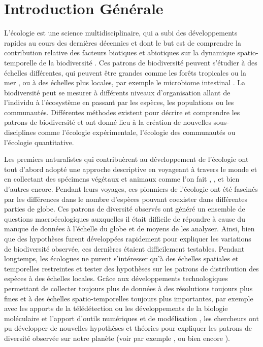 \begin{refsection}

\hypertarget{introduction-guxe9nuxe9rale}{%
\chapter{Introduction Générale}\label{introduction-guxe9nuxe9rale}}

L'écologie est une science multidisciplinaire, qui a subi des
développements rapides au cours des dernières décennies et dont le but
est de comprendre la contribution relative des facteurs biotiques et
abiotiques sur la dynamique spatio-temporelle de la biodiversité
\autocite{Campbell_2012}. Ces patrons de biodiversité peuvent s'étudier
à des échelles différentes, qui peuvent être grandes comme les forêts
tropicales ou la mer \autocite{Chapin_2011}, ou à des échelles plus
locales, par exemple le microbiome intestinal \autocite{Foster_2017}. La
biodiversité peut se mesurer à différents niveaux d'organisation allant
de l'individu à l'écosystème en passant par les espèces, les populations
ou les communautés. Différentes méthodes existent pour décrire et
comprendre les patrons de biodiversité et ont donné lieu à la création
de nouvelles sous-disciplines comme l'écologie expérimentale, l'écologie
des communautés ou l'écologie quantitative.

Les premiers naturalistes qui contribuèrent au développement de
l'écologie ont tout d'abord adopté une approche descriptive en voyageant
à travers le monde et en collectant des spécimens végétaux et animaux
comme l'on fait \textcite{Linnaeus_1789}, \textcite{Humboldt_1805},
\textcite{Darwin_1839} et bien d'autres encore. Pendant leurs voyages,
ces pionniers de l'écologie ont été fascinés par les différences dans le
nombre d'espèces pouvant coexister dans différentes parties de globe.
Ces patrons de diversité observés ont généré un ensemble de questions
macroécologiques auxquelles il était difficile de répondre à cause du
manque de données à l'échelle du globe et de moyens de les analyser.
Ainsi, bien que des hypothèses furent développées rapidement pour
expliquer les variations de biodiversité observée, ces dernières étaient
difficilement testables. Pendant longtemps, les écologues ne purent
s'intéresser qu'à des échelles spatiales et temporelles restreintes et
tester des hypothèses sur les patrons de distribution des espèces à des
échelles locales. Grâce aux développements technologiques permettant de
collecter toujours plus de données à des résolutions toujours plus fines
et à des échelles spatio-temporelles toujours plus importantes, par
exemple avec les apports de la télédétection ou les développements de la
biologie moléculaire \autocite{Edgar_2016} et l'apport d'outils
numériques et de modélisation \autocites[ ]{Legendre_2012}{Guisan_2017},
les chercheurs ont pu développer de nouvelles hypothèses et théories
pour expliquer les patrons de diversité observée sur notre planète (voir
par exemple \textcite{Hubbell_2001}, \textcite{Vellend_2017} ou bien
encore \textcite{Leibold_2018}).


\end{refsection}
